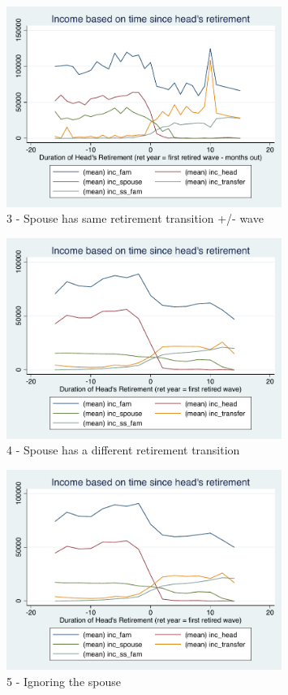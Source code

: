 \documentclass[11pt,onecolumn]{article}
\begin{document}
\begin{figure}[h]
	\caption{3 - Spouse has same retirement transition +/- wave}
	\centering
	\includegraphics[width=0.8\textwidth]{../IncomeAroundRetirement/Income_with_spouse_definition_3.pdf}
\end{figure}

\begin{figure}[h]
	\caption{4 - Spouse has a different retirement transition}
	\centering
	\includegraphics[width=0.8\textwidth]{../IncomeAroundRetirement/Income_with_spouse_definition_4.pdf}
\end{figure}

\begin{figure}[h]
	\caption{5 - Ignoring the spouse}
	\centering
	\includegraphics[width=0.8\textwidth]{../IncomeAroundRetirement/Income_with_spouse_definition_5.pdf}
\end{figure}
\end{document}

